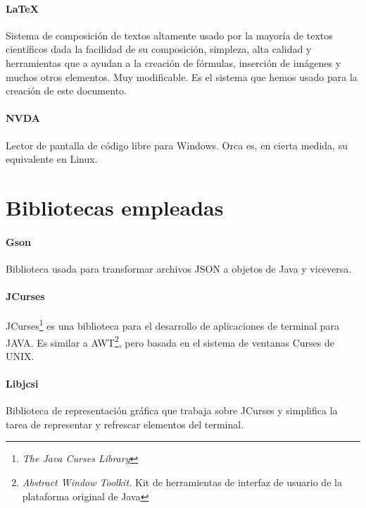 \paragraph{\LaTeX} Sistema de composición de textos altamente usado por la mayoría de textos científicos dada la facilidad de su composición, simpleza, alta calidad y herramientas que a ayudan a la creación de fórmulas, inserción de imágenes y muchos otros elementos. Muy modificable. Es el sistema que hemos usado para la creación de este documento.

\paragraph{NVDA} Lector de pantalla de código libre para Windows. Orca es, en cierta medida, su equivalente en Linux.

\section{Bibliotecas empleadas}

\paragraph{Gson} Biblioteca usada para transformar archivos JSON a objetos de Java y viceversa.

\paragraph{JCurses} JCurses\footnote{\textit{The Java Curses Library}} es una biblioteca para el desarrollo de aplicaciones de terminal para JAVA. Es similar a AWT\footnote{\textit{Abstract Window Toolkit.} Kit de herramientas de interfaz de usuario de la plataforma original de Java}, pero basada en el sistema de ventanas Curses de UNIX.

\paragraph{Libjcsi} Biblioteca de representación gráfica que trabaja sobre JCurses y simplifica la tarea de representar y refrescar elementos del terminal.
